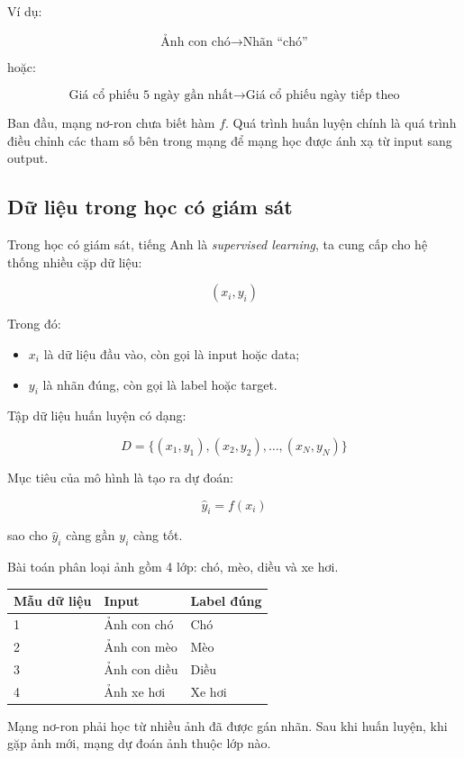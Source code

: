 Ví dụ:

\[
    \text{Ảnh con chó} \rightarrow \text{Nhãn ``chó''}
\]

hoặc:

\[
    \text{Giá cổ phiếu 5 ngày gần nhất} \rightarrow \text{Giá cổ phiếu ngày tiếp theo}
\]

\begin{ghinho}
Ban đầu, mạng nơ-ron chưa biết hàm $f$. Quá trình huấn luyện chính là quá trình điều chỉnh các tham số bên trong mạng để mạng học được ánh xạ từ input sang output.
\end{ghinho}

\subsection{Dữ liệu trong học có giám sát}

Trong học có giám sát, tiếng Anh là \textit{supervised learning}, ta cung cấp cho hệ thống nhiều cặp dữ liệu:

\[
    (x_i, y_i)
\]

Trong đó:

\begin{itemize}
    \item $x_i$ là dữ liệu đầu vào, còn gọi là input hoặc data;
    \item $y_i$ là nhãn đúng, còn gọi là label hoặc target.
\end{itemize}

Tập dữ liệu huấn luyện có dạng:

\[
    D = \{(x_1,y_1),(x_2,y_2),\ldots,(x_N,y_N)\}
\]

Mục tiêu của mô hình là tạo ra dự đoán:

\[
    \hat{y}_i = f(x_i)
\]

sao cho $\hat{y}_i$ càng gần $y_i$ càng tốt.

\begin{vidu}
Bài toán phân loại ảnh gồm 4 lớp: chó, mèo, diều và xe hơi.

\begin{center}
\begin{tabular}{lll}
\toprule
Mẫu dữ liệu & Input & Label đúng \\
\midrule
1 & Ảnh con chó & Chó \\
2 & Ảnh con mèo & Mèo \\
3 & Ảnh con diều & Diều \\
4 & Ảnh xe hơi & Xe hơi \\
\bottomrule
\end{tabular}
\end{center}

Mạng nơ-ron phải học từ nhiều ảnh đã được gán nhãn. Sau khi huấn luyện, khi gặp ảnh mới, mạng dự đoán ảnh thuộc lớp nào.
\end{vidu}


